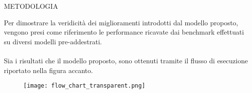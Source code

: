 \begin{frame}{METODOLOGIA}
    \begin{minipage}{\linewidth}
        \centering
        \begin{minipage}{0.40\linewidth}
            Per dimostrare la veridicità dei miglioramenti introdotti dal modello proposto, vengono presi come riferimento le performance ricavate dai benchmark effettuati su diversi modelli pre-addestrati.\\
            \\
            Sia i risultati che il modello proposto, sono ottenuti tramite il flusso di esecuzione riportato nella figura accanto.
        \end{minipage}
        \hspace{0.3cm}
        \begin{minipage}{0.55\linewidth}
            \begin{figure}
                \texttt{[image: flow\_chart\_transparent.png]}
            \end{figure}
        \end{minipage}
    \end{minipage}    
\end{frame}
